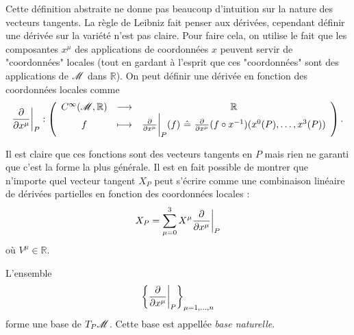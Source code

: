 \documentclass[a4paper,11pt]{report}
\begin{document}
                Cette définition abstraite ne donne pas beaucoup d'intuition sur la nature des vecteurs tangents. La règle de Leibniz fait penser aux dérivées, cependant définir une dérivée sur la variété n'est pas claire. Pour faire cela, on utilise le fait que les composantes $x^\mu$ des applications de coordonnées $x$ peuvent servir de "coordonnées" locales (tout en gardant à l'esprit que ces "coordonnées" sont des applications de $\mathscr{M}$ dans $\mathbb{R}$). On peut définir une dérivée en fonction des coordonnées locales comme
                \begin{equation}
                \frac{\partial}{\partial x^\mu}\bigg|_P:\left(
                \begin{array}{ccc}
                    C^\infty(\mathscr{M},\mathbb{R}) & \longrightarrow & \mathbb{R} \\
                    f & \longmapsto & \frac{\partial}{\partial x^\mu}\bigg|_P(f) ~\hat{=}~ \frac{\partial}{\partial x^\mu}(f\circ x^{-1})(x^0(P),\dots,x^3(P))
                \end{array}
                \right).
                \end{equation}
                
                Il est claire que ces fonctions sont des vecteurs tangents en $P$ mais rien ne garanti que c'est la forme la plus générale. Il est en fait possible de montrer que n'importe quel vecteur tangent $X_P$ peut s'écrire comme une combinaison linéaire de dérivées partielles en fonction des coordonnées locales :
                \begin{equation}
                    X_P = \sum_{\mu=0}^3 X^\mu \frac{\partial}{\partial x^\mu}\bigg|_P
                \end{equation}
                où $V^\mu\in\mathbb{R}$.
                
                \begin{prop}\begin{leftbar}
                    L'ensemble
                    \begin{equation}
                        \left\{ \frac{\partial}{\partial x^\mu}\bigg|_P \right\}_{\mu=1,\dots,n}
                    \end{equation}
                    forme une base de $T_P\mathscr{M}$. Cette base est appellée \textit{base naturelle}.
                \end{leftbar}\end{prop}
                
\end{document}
